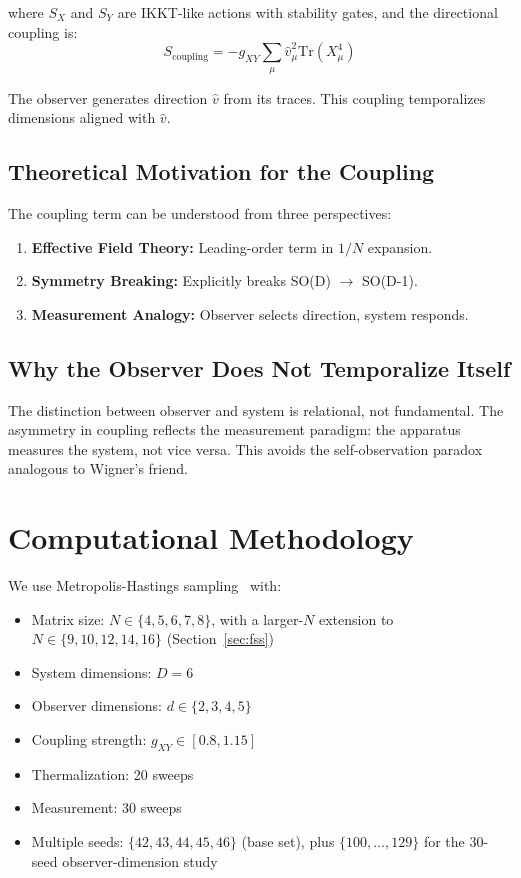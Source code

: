 \documentclass[12pt,a4paper]{article}
\begin{document}
where $S_X$ and $S_Y$ are IKKT-like actions with stability gates, and the 
directional coupling is:
\begin{equation}
S_{\text{coupling}} = -g_{XY} \sum_\mu \hat{v}_\mu^2 \text{Tr}(X_\mu^4)
\end{equation}

The observer generates direction $\hat{v}$ from its traces. This coupling 
temporalizes dimensions aligned with $\hat{v}$.

\subsection{Theoretical Motivation for the Coupling}

The coupling term can be understood from three perspectives:

\begin{enumerate}[leftmargin=*]
\item \textbf{Effective Field Theory:} Leading-order term in $1/N$ expansion.
\item \textbf{Symmetry Breaking:} Explicitly breaks SO(D) $\rightarrow$ SO(D-1).
\item \textbf{Measurement Analogy:} Observer selects direction, system responds.
\end{enumerate}

\subsection{Why the Observer Does Not Temporalize Itself}

The distinction between observer and system is relational, not fundamental. 
The asymmetry in coupling reflects the measurement paradigm: the apparatus 
measures the system, not vice versa. This avoids the self-observation paradox 
analogous to Wigner's friend.

\section{Computational Methodology}\label{sec:method}

We use Metropolis-Hastings sampling~\cite{metropolis_1953} with:
\begin{itemize}
\item Matrix size: $N \in \{4, 5, 6, 7, 8\}$, with a larger-$N$ extension to
      $N \in \{9, 10, 12, 14, 16\}$ (Section~\ref{sec:fss})
\item System dimensions: $D = 6$
\item Observer dimensions: $d \in \{2, 3, 4, 5\}$
\item Coupling strength: $g_{XY} \in [0.8, 1.15]$
\item Thermalization: 20 sweeps
\item Measurement: 30 sweeps
\item Multiple seeds: $\{42, 43, 44, 45, 46\}$ (base set), plus
      $\{100,\dots,129\}$ for the $30$-seed observer-dimension study
\end{itemize}
\end{document}

